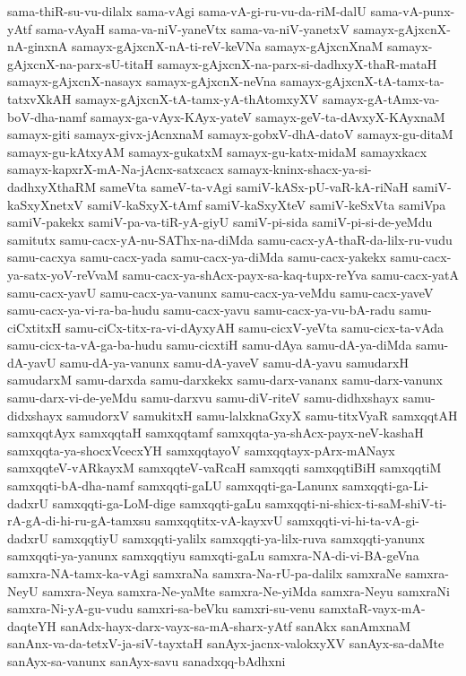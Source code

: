 {sama-thiR-su-vu-dilalx
sama-vAgi
sama-vA-gi-ru-vu-da-riM-dalU
sama-vA-punx-yAtf
sama-vAyaH
sama-va-niV-yaneVtx
sama-va-niV-yanetxV
samayx-gAjxcnX-nA-ginxnA
samayx-gAjxcnX-nA-ti-reV-keVNa
samayx-gAjxcnXnaM
samayx-gAjxcnX-na-parx-sU-titaH
samayx-gAjxcnX-na-parx-si-dadhxyX-thaR-mataH
samayx-gAjxcnX-nasayx
samayx-gAjxcnX-neVna
samayx-gAjxcnX-tA-tamx-ta-tatxvXkAH
samayx-gAjxcnX-tA-tamx-yA-thAtomxyXV
samayx-gA-tAmx-va-boV-dha-namf
samayx-ga-vAyx-KAyx-yateV
samayx-geV-ta-dAvxyX-KAyxnaM
samayx-giti
samayx-givx-jAcnxnaM
samayx-gobxV-dhA-datoV
samayx-gu-ditaM
samayx-gu-kAtxyAM
samayx-gukatxM
samayx-gu-katx-midaM
samayxkacx
samayx-kapxrX-mA-Na-jAcnx-satxcacx
samayx-kninx-shacx-ya-si-dadhxyXthaRM
sameVta
sameV-ta-vAgi
samiV-kASx-pU-vaR-kA-riNaH
samiV-kaSxyXnetxV
samiV-kaSxyX-tAmf
samiV-kaSxyXteV
samiV-keSxVta
samiVpa
samiV-pakekx
samiV-pa-va-tiR-yA-giyU
samiV-pi-sida
samiV-pi-si-de-yeMdu
samitutx
samu-cacx-yA-nu-SAThx-na-diMda
samu-cacx-yA-thaR-da-lilx-ru-vudu
samu-cacxya
samu-cacx-yada
samu-cacx-ya-diMda
samu-cacx-yakekx
samu-cacx-ya-satx-yoV-reVvaM
samu-cacx-ya-shAcx-payx-sa-kaq-tupx-reYva
samu-cacx-yatA
samu-cacx-yavU
samu-cacx-ya-vanunx
samu-cacx-ya-veMdu
samu-cacx-yaveV
samu-cacx-ya-vi-ra-ba-hudu
samu-cacx-yavu
samu-cacx-ya-vu-bA-radu
samu-ciCxtitxH
samu-ciCx-titx-ra-vi-dAyxyAH
samu-cicxV-yeVta
samu-cicx-ta-vAda
samu-cicx-ta-vA-ga-ba-hudu
samu-cicxtiH
samu-dAya
samu-dA-ya-diMda
samu-dA-yavU
samu-dA-ya-vanunx
samu-dA-yaveV
samu-dA-yavu
samudarxH
samudarxM
samu-darxda
samu-darxkekx
samu-darx-vananx
samu-darx-vanunx
samu-darx-vi-de-yeMdu
samu-darxvu
samu-diV-riteV
samu-didhxshayx
samu-didxshayx
samudorxV
samukitxH
samu-lalxknaGxyX
samu-titxVyaR
samxqqtAH
samxqqtAyx
samxqqtaH
samxqqtamf
samxqqta-ya-shAcx-payx-neV-kashaH
samxqqta-ya-shocxVcecxYH
samxqqtayoV
samxqqtayx-pArx-mANayx
samxqqteV-vARkayxM
samxqqteV-vaRcaH
samxqqti
samxqqtiBiH
samxqqtiM
samxqqti-bA-dha-namf
samxqqti-gaLU
samxqqti-ga-Lanunx
samxqqti-ga-Li-dadxrU
samxqqti-ga-LoM-dige
samxqqti-gaLu
samxqqti-ni-shicx-ti-saM-shiV-ti-rA-gA-di-hi-ru-gA-tamxsu
samxqqtitx-vA-kayxvU
samxqqti-vi-hi-ta-vA-gi-dadxrU
samxqqtiyU
samxqqti-yalilx
samxqqti-ya-lilx-ruva
samxqqti-yanunx
samxqqti-ya-yanunx
samxqqtiyu
samxqti-gaLu
samxra-NA-di-vi-BA-geVna
samxra-NA-tamx-ka-vAgi
samxraNa
samxra-Na-rU-pa-dalilx
samxraNe
samxra-NeyU
samxra-Neya
samxra-Ne-yaMte
samxra-Ne-yiMda
samxra-Neyu
samxraNi
samxra-Ni-yA-gu-vudu
samxri-sa-beVku
samxri-su-venu
samxtaR-vayx-mA-daqteYH
sanAdx-hayx-darx-vayx-sa-mA-sharx-yAtf
sanAkx
sanAmxnaM
sanAnx-va-da-tetxV-ja-siV-tayxtaH
sanAyx-jacnx-valokxyXV
sanAyx-sa-daMte
sanAyx-sa-vanunx
sanAyx-savu
sanadxqq-bAdhxni
}
